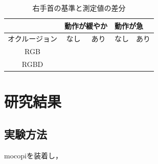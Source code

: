 \documentclass[titlepage]{jarticle}
\begin{document}
\begin{table}[b!]
  \centering
  \caption{右手首の基準と測定値の差分}
  \begin{tabular}{c||c|c|c|c}
            & \multicolumn{2}{l}{動作が緩やか} & \multicolumn{2}{l}{動作が急}           \\\hline
    オクルージョン & なし                         & あり                       & なし & あり \\\hline\hline
    RGB     &                            &                          &    &    \\
    RGBD    &                            &                          &    &    \\\hline
  \end{tabular}
  \label{righthand}
\end{table}
%
%
%
%
%

%
%
%
%
\section{研究結果}
%


%
%
\subsection{実験方法}
%
mocopiを装着し，
%
%
%
\end{document}

